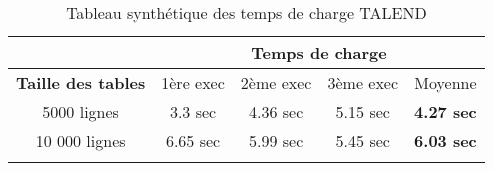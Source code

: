 \documentclass[12pt,a4wide,twoside]{report}
\begin{document}
			\begin{table}
				\begin{center}
					\begin{tabular}{|c|c|c|c|c|}
					\hline
					 &\multicolumn{4}{c|}{\textbf{Temps de charge}}\\
					\hline
					\textbf{Taille des tables}&1ère exec&2ème exec&3ème exec&Moyenne\\
					\hline
					\multirow{1}{2cm}{5000 lignes}&3.3 sec&4.36 sec&5.15 sec&\textbf{4.27 sec} \\
					10 000 lignes&6.65 sec&5.99 sec&5.45 sec&\textbf{6.03 sec}\\
					& & & &\\
					\hline	
					\end{tabular}
					\end{center}
					\caption{Tableau synthétique des temps de charge TALEND}
					
					\end{table} 
\end{document}
